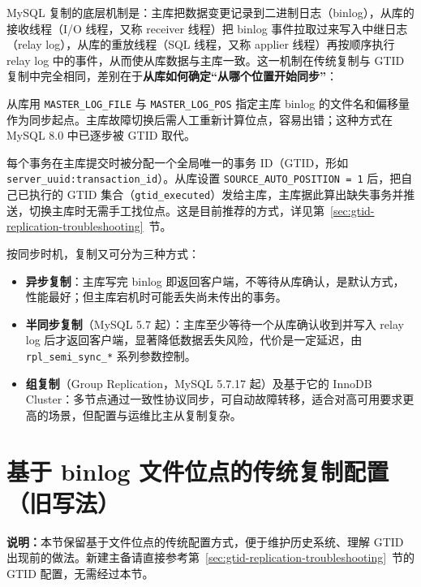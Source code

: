 \documentclass[12pt,UTF8]{ctexbook}
\begin{document}
MySQL 复制的底层机制是：主库把数据变更记录到二进制日志（binlog），从库的接收线程（I/O 线程，又称 receiver 线程）把 binlog 事件拉取过来写入中继日志（relay log），从库的重放线程（SQL 线程，又称 applier 线程）再按顺序执行 relay log 中的事件，从而使从库数据与主库一致。这一机制在传统复制与 GTID 复制中完全相同，差别在于\textbf{从库如何确定“从哪个位置开始同步”}：

\begin{description}[leftmargin=2.8cm]
  \item[基于文件位点的传统定位] 从库用 \texttt{MASTER\_LOG\_FILE} 与 \texttt{MASTER\_LOG\_POS} 指定主库 binlog 的文件名和偏移量作为同步起点。主库故障切换后需人工重新计算位点，容易出错；这种方式在 MySQL 8.0 中已逐步被 GTID 取代。
  \item[基于 GTID 的自动定位] 每个事务在主库提交时被分配一个全局唯一的事务 ID（GTID，形如 \texttt{server\_uuid:transaction\_id}）。从库设置 \texttt{SOURCE\_AUTO\_POSITION = 1} 后，把自己已执行的 GTID 集合（\texttt{gtid\_executed}）发给主库，主库据此算出缺失事务并推送，切换主库时无需手工找位点。这是目前推荐的方式，详见第~\ref{sec:gtid-replication-troubleshooting}~节。
\end{description}

按同步时机，复制又可分为三种方式：

\begin{itemize}[leftmargin=2cm]
  \item \textbf{异步复制}：主库写完 binlog 即返回客户端，不等待从库确认，是默认方式，性能最好；但主库宕机时可能丢失尚未传出的事务。
  \item \textbf{半同步复制}（MySQL 5.7 起）：主库至少等待一个从库确认收到并写入 relay log 后才返回客户端，显著降低数据丢失风险，代价是一定延迟，由 \texttt{rpl\_semi\_sync\_*} 系列参数控制。
  \item \textbf{组复制}（Group Replication，MySQL 5.7.17 起）及基于它的 InnoDB Cluster：多节点通过一致性协议同步，可自动故障转移，适合对高可用要求更高的场景，但配置与运维比主从复制复杂。
\end{itemize}

\section{基于 binlog 文件位点的传统复制配置（旧写法）}

\textbf{说明：}本节保留基于文件位点的传统配置方式，便于维护历史系统、理解 GTID 出现前的做法。新建主备请直接参考第~\ref{sec:gtid-replication-troubleshooting}~节的 GTID 配置，无需经过本节。
\end{document}
